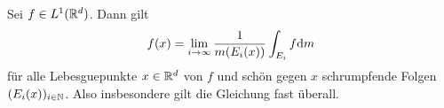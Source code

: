 Sei $f\in L^1(\mathbb{R}^d)$. Dann gilt
\begin{equation*}
    f(x)=\lim_{i\to\infty} \frac{1}{m(E_i(x))} \int_{E_i} f \mathrm{d} m
\end{equation*}
für alle Lebesguepunkte $x\in\mathbb{R}^d$ von $f$ und schön gegen $x$ schrumpfende Folgen $(E_i(x))_{i\in\mathbb{N}}$. Also insbesondere gilt die Gleichung fast überall.